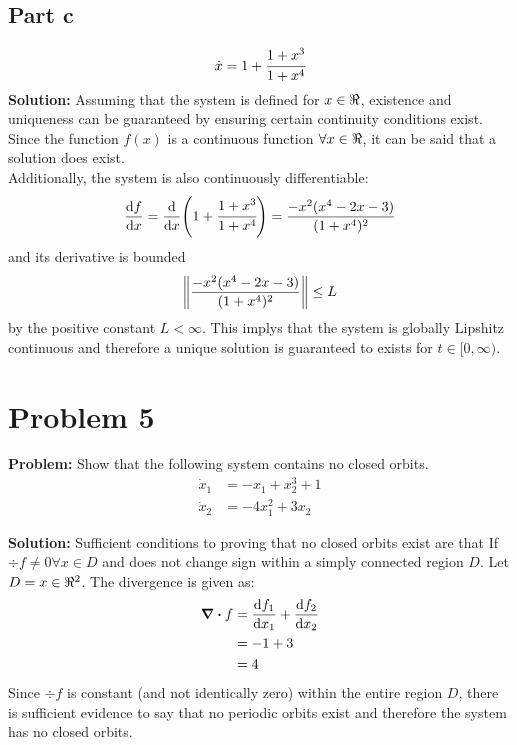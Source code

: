 \documentclass[letter]{article}
\numberwithin{equation}{section}
\begin{document}
\subsection{Part c}
\begin{equation}
	\dot{x} = 1 + \cfrac{1 + x^3}{1 + x^4}
\end{equation}
\noindent
\textbf{Solution:}
Assuming that the system is defined for $x\in \real$, existence and uniqueness can be guaranteed by ensuring certain continuity conditions exist.\\
Since the function $f(x)$ is a continuous function $\forall x \in \real$, it can be said that a solution does exist.\\
Additionally, the system is also continuously differentiable:
$$\dv{f}{x} = \dv{x} \qty(1 + \cfrac{1 + x^3}{1 + x^4}) = \frac{-x^2(x^4 - 2x - 3)}{(1+x^4)^2}$$
and its derivative is bounded
$$\norm{\frac{-x^2(x^4 - 2x - 3)}{(1+x^4)^2}} \leq L$$
by the positive constant $L < \infty$. This implys that the system is globally Lipshitz continuous and therefore a unique solution is guaranteed to exists for $t \in [0,\infty)$.

\newpage
\section{Problem 5}
\textbf{Problem:}
Show that the following system contains no closed orbits.
\begin{equation}
	\begin{aligned}
		\dot{x}_1 &= -x_1 + x_2^3 + 1\\
		\dot{x}_2 &= -4x_1^2 + 3 x_2
	\end{aligned}
\end{equation}

\noindent
\textbf{Solution:}
Sufficient conditions to proving that no closed orbits exist are that
If $\div{f} \neq 0 \forall x \in D$ and does not change sign within a simply connected region $D$.
Let $D = x\in\real^2$. The divergence is given as:
\begin{align}
	\div{f} &= \dv{f_1}{x_1} + \dv{f_2}{x_2}\\
	&= -1 + 3\\
	&= 4
\end{align}
Since $\div{f}$ is constant (and not identically zero) within the entire region $D$, there is sufficient evidence to say that no periodic orbits exist and therefore the system has no closed orbits.
\end{document}
